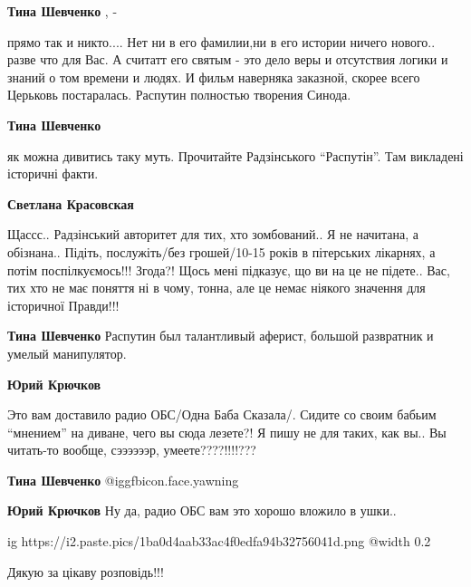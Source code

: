 \begin{itemize}
\begin{itemize}
\begin{itemize} %
\textbf{Тина Шевченко} , - 

прямо так и никто.... Нет ни в его фамилии,ни в его истории ничего
нового.. разве что для Вас. А считатт его святым - это дело веры и отсутствия
логики и знаний о том времени и людях. И фильм наверняка заказной, скорее всего
Церьковь постаралась. Распутин полностью творения Синода.


\textbf{Тина Шевченко} 

як можна дивитись таку муть. Прочитайте Радзінського \enquote{Распутін}. Там
викладені історичні факти.

\textbf{Светлана Красовская} 

Щассс.. Радзінський авторитет для тих, хто зомбований.. Я не начитана, а
обізнана.. Підіть, послужіть/без грошей/10-15 років в пітерських лікарнях, а
потім поспілкуємось!!! Згода?! Щось мені підказує, що ви на це не підете.. Вас,
тих хто не має поняття ні в чому, тонна, але це немає ніякого значення для
історичної Правди!!!

\end{itemize} %

\textbf{Тина Шевченко} Распутин был талантливый аферист, большой развратник и умелый манипулятор.

\begin{itemize} %
\textbf{Юрий Крючков} 

Это вам доставило радио ОБС/Одна Баба Сказала/. Сидите со своим бабьим
\enquote{мнением} на диване, чего вы сюда лезете?! Я пишу не для таких, как вы.. Вы
читать-то вообще, сээээээр, умеете????!!!!???

\textbf{Тина Шевченко}  @igg{fbicon.face.yawning} 

\textbf{Юрий Крючков} Ну да, радио ОБС вам это хорошо вложило в ушки..
\end{itemize} %

\end{itemize} %


\ifcmt
  ig https://i2.paste.pics/1ba0d4aab33ac4f0edfa94b32756041d.png
  @width 0.2
\fi

Дякую за цікаву розповідь!!!



\end{itemize}
